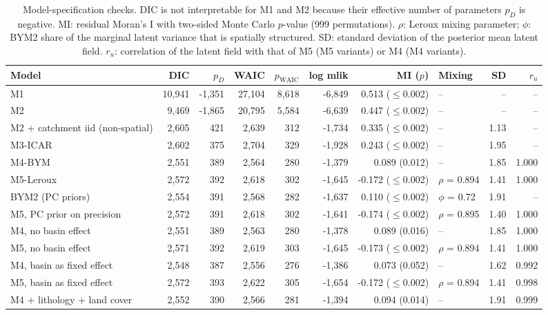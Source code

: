 \documentclass[journal abbreviation, manuscript]{copernicus}
\begin{document}
\begin{table}[h]
\caption{Model-specification checks. DIC is not interpretable for M1 and M2 because their effective number of parameters $p_D$ is negative. MI: residual Moran's I with two-sided Monte Carlo $p$-value (999 permutations). $\rho$: Leroux mixing parameter; $\phi$: BYM2 share of the marginal latent variance that is spatially structured. SD: standard deviation of the posterior mean latent field. $r_u$: correlation of the latent field with that of M5 (M5 variants) or M4 (M4 variants).}\label{tabA7}
\footnotesize
\begin{tabular}{@{}lrrrrrrlrr@{}}
\toprule
Model & DIC & $p_D$ & WAIC & $p_{\mathrm{WAIC}}$ & log mlik & MI ($p$) & Mixing & SD & $r_u$ \\
\midrule
M1 & 10,941 & -1,351 & 27,104 & 8,618 & -6,849 & 0.513 ($\leq$0.002) & -- & -- & -- \\
M2 & 9,469 & -1,865 & 20,795 & 5,584 & -6,639 & 0.447 ($\leq$0.002) & -- & -- & -- \\
M2 + catchment iid (non-spatial) & 2,605 & 421 & 2,639 & 312 & -1,734 & 0.335 ($\leq$0.002) & -- & 1.13 & -- \\
M3-ICAR & 2,602 & 375 & 2,704 & 329 & -1,928 & 0.243 ($\leq$0.002) & -- & 1.95 & -- \\
M4-BYM & 2,551 & 389 & 2,564 & 280 & -1,379 & 0.089 (0.012) & -- & 1.85 & 1.000 \\
M5-Leroux & 2,572 & 392 & 2,618 & 302 & -1,645 & -0.172 ($\leq$0.002) & $\rho$ = 0.894 & 1.41 & 1.000 \\
BYM2 (PC priors) & 2,554 & 391 & 2,568 & 282 & -1,637 & 0.110 ($\leq$0.002) & $\phi$ = 0.72 & 1.91 & -- \\
M5, PC prior on precision & 2,572 & 391 & 2,618 & 302 & -1,641 & -0.174 ($\leq$0.002) & $\rho$ = 0.895 & 1.40 & 1.000 \\
M4, no basin effect & 2,551 & 389 & 2,563 & 280 & -1,378 & 0.089 (0.016) & -- & 1.85 & 1.000 \\
M5, no basin effect & 2,571 & 392 & 2,619 & 303 & -1,645 & -0.173 ($\leq$0.002) & $\rho$ = 0.894 & 1.41 & 1.000 \\
M4, basin as fixed effect & 2,548 & 387 & 2,556 & 276 & -1,386 & 0.073 (0.052) & -- & 1.62 & 0.992 \\
M5, basin as fixed effect & 2,572 & 393 & 2,622 & 305 & -1,654 & -0.172 ($\leq$0.002) & $\rho$ = 0.894 & 1.41 & 0.998 \\
M4 + lithology + land cover & 2,552 & 390 & 2,566 & 281 & -1,394 & 0.094 (0.014) & -- & 1.91 & 0.999 \\

\end{tabular}
\end{table}
\end{document}
